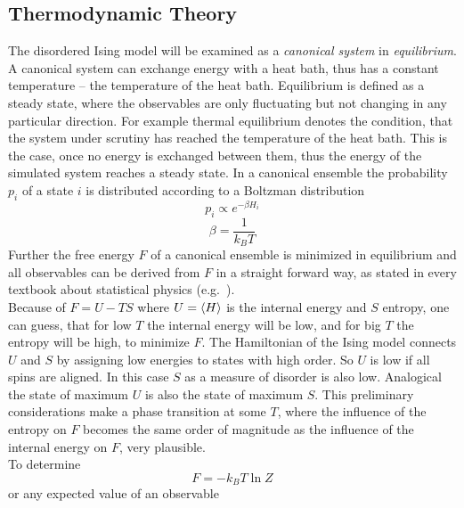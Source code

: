 \subsection{Thermodynamic Theory}
\label{ssec:theory}
    The disordered Ising model will be examined as a \emph{canonical system} in
    \emph{equilibrium}. A canonical system can exchange energy with a
    heat bath, thus has a constant temperature -- the temperature of the
    heat bath.
    Equilibrium is defined as a steady state, where
    the observables are only fluctuating but not changing in any
    particular direction. For example thermal equilibrium denotes the
    condition, that the system under scrutiny has reached the temperature
    of the heat bath. This is the case, once no energy is exchanged
    between them, thus the energy of the simulated system reaches a
    steady state.
    In a canonical ensemble the probability \(p_i\) of a state
    \(i\) is distributed according to a Boltzman distribution
    \begin{equation}
        p_i \propto e^{-\beta H_i}
    \end{equation}
    \begin{equation}
        \beta = \frac{1}{k_B T}
    \end{equation}
    Further the free energy \(F\) of a canonical ensemble is minimized
    in equilibrium and all observables can be derived from \(F\)
    in a straight forward way, as stated in every textbook about
    statistical physics (e.g.\ \cite{nolting2005}).\\
    Because of \(F=U-TS\) where \(U=\left< H \right>\) is the internal energy and
    \(S\) entropy, one can guess, that for low \(T\) the internal energy
    will be low, and for big \(T\) the entropy will be high, to minimize
    \(F\). The Hamiltonian of the Ising model connects \(U\) and \(S\)
    by assigning low energies to states with high order. So \(U\) is low
    if all spins are aligned. In this case \(S\) as a measure of
    disorder is also low. Analogical the state of maximum \(U\) is also
    the state of maximum \(S\).
    This preliminary considerations make a phase transition at some
    \(T\), where the influence of the entropy on \(F\) becomes the same
    order of magnitude as the influence of the internal energy on \(F\),
    very plausible.\\
    To determine
    \begin{equation}
        F=-k_{B}T \ln{Z}
    \end{equation}
    or any expected value of an observable
